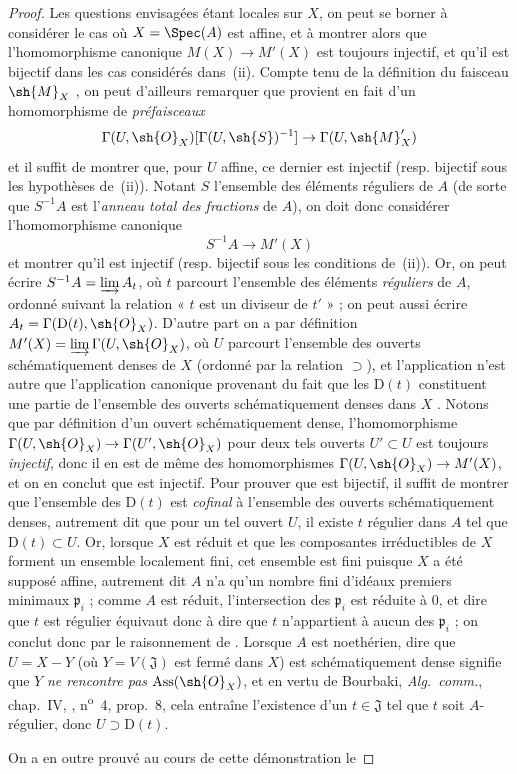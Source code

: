 \begin{proof}
Les questions envisagées étant locales sur $X$, on peut se borner à considérer le cas où $X=\Spec(A)$ est affine, et à montrer alors que l'homomorphisme canonique $M(X)\to M'(X)$ est toujours injectif, et qu'il est bijectif dans les cas considérés dans~(ii).
Compte tenu de la définition du faisceau $\sh{M}_X$ , on peut d'ailleurs remarquer que  provient en fait d'un homomorphisme de \emph{préfaisceaux}
\[
  \Gamma(U,\sh{O}_X)[\Gamma(U,\sh{S})^{-1}]\to\Gamma(U,\sh{M}'_X)
\]
et il suffit de montrer que, pour $U$ affine, ce dernier est injectif (resp. bijectif sous les hypothèses de~(ii)).
Notant $S$ l'ensemble des éléments réguliers de $A$ (de sorte que $S^{-1}A$ est l'\emph{anneau total des fractions} de $A$), on doit donc considérer l'homomorphisme canonique
\[
\label{IV.20.2.11.1}
  S^{-1}A\to M'(X)
  \tag{20.2.11.1}
\]
et montrer qu'il est injectif (resp. bijectif sous les conditions de~(ii)).
Or, on peut écrire $S^{-1}A=\varinjlim A_t$, où $t$ parcourt l'ensemble des éléments \emph{réguliers} de $A$, ordonné suivant la relation « $t$ est un diviseur de $t'$ »  ; on peut aussi écrire $A_t=\Gamma(\mathrm{D}(t),\sh{O}_X)$.
D'autre part on a par définition $M'(X)=\varinjlim\Gamma(U,\sh{O}_X)$, où $U$ parcourt l'ensemble des ouverts schématiquement denses de $X$ (ordonné par la relation $\supset$), et l'application  n'est autre que l'application canonique provenant du fait que les $\mathrm{D}(t)$ constituent une partie de l'ensemble des ouverts schématiquement denses dans $X$ .
Notons que par définition d'un ouvert schématiquement dense, l'homomorphisme $\Gamma(U,\sh{O}_X)\to\Gamma(U',\sh{O}_X)$ pour deux tels ouverts $U'\subset U$ est toujours \emph{injectif}, donc il en est de même des homomorphismes $\Gamma(U,\sh{O}_X)\to M'(X)$, et on en conclut que  est injectif.
Pour prouver que  est bijectif, il suffit de montrer que l'ensemble des $\mathrm{D}(t)$ est \emph{cofinal} à l'ensemble des ouverts schématiquement denses, autrement dit que pour un tel ouvert $U$, il existe $t$ régulier dans $A$ tel que $\mathrm{D}(t)\subset U$.
Or, lorsque $X$ est réduit et que les composantes irréductibles de $X$ forment un ensemble localement fini, cet ensemble est fini puisque $X$ a été supposé affine, autrement dit $A$ n'a qu'un nombre fini d'idéaux premiers minimaux $\mathfrak{p}_i$ ; comme $A$ est réduit, l'intersection des $\mathfrak{p}_i$ est réduite à $0$, et dire que $t$ est régulier équivaut donc à dire que $t$ n'appartient à aucun des $\mathfrak{p}_i$ ; on conclut donc par le raisonnement de .
Lorsque $A$ est noethérien, dire que $U=X-Y$ (où $Y=V(\mathfrak{J})$ est fermé dans $X$) est schématiquement dense signifie  que $Y$ \emph{ne rencontre pas} $\operatorname{Ass}(\sh{O}_X)$, et en vertu de Bourbaki, \emph{Alg.~comm.}, chap.~IV, , n\textsuperscript{o}~4, prop.~8, cela entraîne l'existence d'un $t\in\mathfrak{J}$ tel que $t$ soit $A$-régulier, donc $U\supset\mathrm{D}(t)$.

On a en outre prouvé au cours de cette démonstration le
\end{proof}

